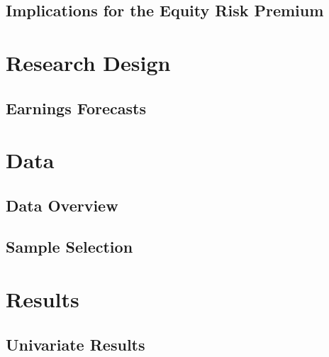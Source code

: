 \documentclass[12pt, letterpaper]{article}
\begin{document}
\subsection{Implications for the Equity Risk Premium}


\section{Research Design}
\subsection{Earnings Forecasts}




\section{Data}
\subsection{Data Overview}



%


\subsection{Sample Selection}

\section{Results}
\subsection{Univariate Results}
\end{document}
